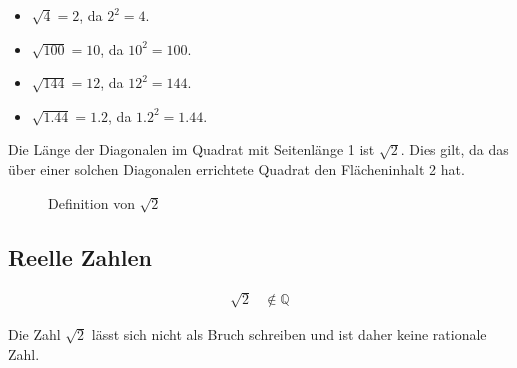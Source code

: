 \begin{bsp}
 \begin{itemize}
  \item \(\sqrt{4} =2\), da \(2^2 =4\).
  \item \(\sqrt{100} = 10\), da \(10^2 =100\).
  \item \(\sqrt{144} = 12\), da \(12^2 =144\).
  \item \(\sqrt{1.44} = 1.2\), da \(1.2^2 =1.44\).
 \end{itemize}

\end{bsp}

\begin{regel}
 Die Länge der Diagonalen im Quadrat mit Seitenlänge 1 ist \(\sqrt{2}\). Dies gilt, da das über einer solchen Diagonalen errichtete Quadrat den Flächeninhalt 2 hat.
 
 \begin{figure}\begin{center}
               \end{center}
\caption{Definition von \ensuremath{\sqrt{2}}}
\end{figure}
\end{regel}

\subsection{Reelle Zahlen}

\begin{ssatz}

\Large
\begin{whitebox}
 \begin{align*}
  \sqrt{2} &\not\in \mathbb{Q}
 \end{align*}
\end{whitebox}
\normalsize

Die Zahl \(\sqrt{2}\) lässt sich nicht als Bruch schreiben und ist daher keine rationale Zahl.
\end{ssatz}

